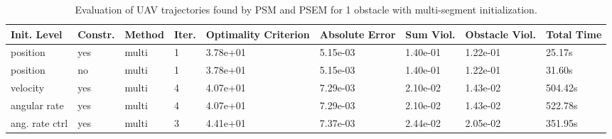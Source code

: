 \begin{table}
\small

\caption{Evaluation of UAV trajectories found by PSM and PSEM for 1 obstacle with multi-segment initialization.}
\label{tab:traj-plan-eval-simple-multi}
\begin{tabular}{p{21mm}p{9mm}p{12mm}p{6mm}p{14mm}p{14mm}p{14mm}p{14mm}p{14mm}}
\toprule
Init. Level & Constr. & Method & Iter. & Optimality Criterion & Absolute Error & Sum Viol. & Obstacle Viol. & Total Time \\
\midrule
position & yes & multi & \cellcolor{color3} 1 & \cellcolor{color3} 3.78e+01 & \cellcolor{color3} 5.15e-03 & \cellcolor{color8} 1.40e-01 & \cellcolor{color8} 1.22e-01 & \cellcolor{color3} 25.17s \\
position & no & multi & \cellcolor{color3} 1 & \cellcolor{color3} 3.78e+01 & \cellcolor{color3} 5.15e-03 & \cellcolor{color8} 1.40e-01 & \cellcolor{color8} 1.22e-01 & 31.60s \\
velocity & yes & multi & \cellcolor{color8} 4 & 4.07e+01 & 7.29e-03 & \cellcolor{color3} 2.10e-02 & \cellcolor{color3} 1.43e-02 & 504.42s \\
angular rate & yes & multi & \cellcolor{color8} 4 & 4.07e+01 & 7.29e-03 & \cellcolor{color3} 2.10e-02 & \cellcolor{color3} 1.43e-02 & \cellcolor{color8} 522.78s \\
ang. rate ctrl & yes & multi & 3 & \cellcolor{color8} 4.41e+01 & \cellcolor{color8} 7.37e-03 & 2.44e-02 & 2.05e-02 & 351.95s \\
\bottomrule
\end{tabular}
\end{table}
